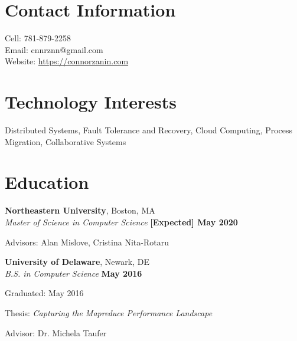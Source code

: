 \documentclass[margin,line]{resume}
\newif\ifReferences
\newif\ifOnline
\begin{document}
\Referencesfalse
\Onlinefalse


\begin{resume}


\section{\mysidestyle Contact Information}
\ifOnline
	Email: cnnrznn@gmail.com	 							\hfill Boston, MA\\
\else
   	\mbox{} \hfill Cell: 781-879-2258\\
   	\mbox{} \hfill Email: cnnrznn@gmail.com\\
    \mbox{} \hfill Website: \url{https://connorzanin.com}\\
\fi
   




\section{\mysidestyle Technology Interests}
Distributed Systems, Fault Tolerance and Recovery, Cloud Computing, Process Migration, Collaborative Systems


\section{\mysidestyle Education}
\textbf{Northeastern University}, Boston, MA \vspace{1mm}\\%
\textsl{Master of Science in Computer Science} \hfill \textbf{[Expected] May 2020}
\vspace{-3mm}\\\vspace{-1mm}%
\begin{list2}
	\item Advisors: Alan Mislove, Cristina Nita-Rotaru
\end{list2}

\textbf{University of Delaware}, Newark, DE \vspace{1mm}\\%
\textsl{B.S. in Computer Science} \hfill \textbf{May 2016}\vspace{-3mm}\\\vspace{-1mm}%
\begin{list2}
    \item Graduated: May 2016
    \item Thesis: \textsl{Capturing the Mapreduce Performance Landscape}
    \item Advisor:  Dr. Michela Taufer
\end{list2}\vspace{-1.5mm}    



\end{resume}
\end{document}
